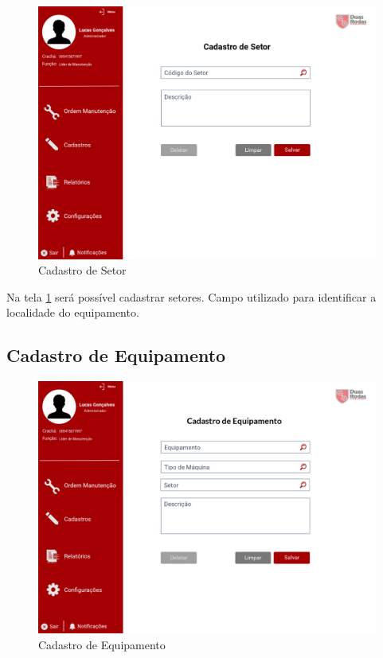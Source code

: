 \begin{figure}[htb]
	\caption{\label{web_cad-setor}Cadastro de Setor}
	\begin{center}
		\includegraphics[scale=0.55]{./Figuras/web/cad-setor.png}
	\end{center}
\end{figure}

Na tela \ref{web_cad-setor} será possível cadastrar setores. Campo utilizado para identificar a localidade do equipamento.

\newpage
\subsection{Cadastro de Equipamento}

\begin{figure}[htb]
	\caption{\label{web_cad-equip}Cadastro de Equipamento}
	\begin{center}
		\includegraphics[scale=0.55]{./Figuras/web/cad-equip.png}
	\end{center}
\end{figure}


